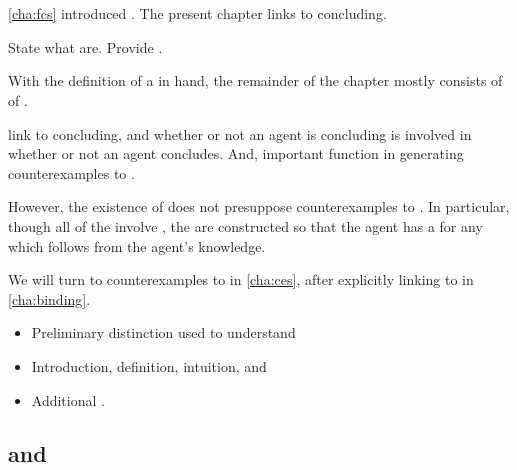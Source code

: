 \chapter{}
\label{cha:requs}

\begin{note}
  \autoref{cha:fcs} introduced .
  The present chapter links  to concluding.

  State what  are.
  Provide .
\end{note}

\begin{note}
  With the definition of a \requ{} in hand, the remainder of the chapter mostly consists of  of .

   link  to concluding, and whether or not an agent is concluding is involved in whether or not an agent concludes.
  And, important function in generating counterexamples to \issueConstraint{}.

  However, the existence of  does not presuppose counterexamples to \issueConstraint{}.
  In particular, though all of the  involve , the  are constructed so that the agent has a  for any \ros{} which follows from the agent's knowledge.

  We will turn to counterexamples to \issueConstraint{} in \autoref{cha:ces}, after explicitly linking  to \qWhyV{} in \autoref{cha:binding}.
\end{note}

\begin{note}
  \begin{itemize}
  \item

    Preliminary distinction used to understand 
  \item

    Introduction, definition, intuition, and 
  \item

    Additional .
  \end{itemize}
\end{note}

\section{ and }
\label{cha:requs:sec:infl}

